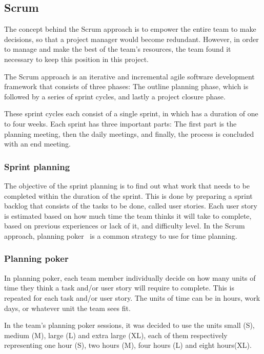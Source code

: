 \subsection{Scrum}
The concept behind the Scrum approach is to empower the entire team to make
decisions, so that a project manager would become redundant. However, in order
to manage and make the best of the team's resources, the team found it
necessary to keep this position in this project.

The Scrum approach is an iterative and incremental agile software development
framework that consists of three phases: The outline planning phase, which is
followed by a series of sprint cycles, and lastly a project closure phase.

These sprint cycles each consist of a single sprint, in which has a duration of
one to four weeks. Each sprint has three important parts: The first part is the
planning meeting, then the daily  meetings, and finally, the process is
concluded with an end meeting.

\subsubsection{Sprint planning}
\label{sec:sprintplanning}
The objective of the sprint planning is to find out what work that needs to be completed within the duration of the sprint. This is done by preparing a sprint backlog that consists of the tasks to be done, called user stories. Each user story is estimated based on how much time the team thinks it will take to complete, based on previous experiences or lack of it, and difficulty level. In the Scrum approach, planning poker~\cite{planningpoker} is a common strategy to use for time planning.

\subsubsection{Planning poker}
In planning poker, each team member individually decide on how many units of time they think a task and/or user story will require to complete. This is repeated for each task and/or user story. The units of time can be in hours, work days, or whatever unit the team sees fit.

In the team's planning poker sessions, it was decided to use the units small (S), medium (M), large (L) and extra large (XL), each of them respectively representing one hour (S), two hours (M), four hours (L) and eight hours(XL).

